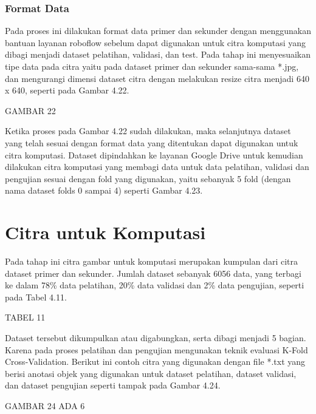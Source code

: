 \subsubsection{Format Data}
\hspace{1,2cm}
Pada proses ini dilakukan format data primer dan sekunder dengan menggunakan bantuan layanan roboflow sebelum dapat digunakan untuk citra komputasi yang dibagi menjadi dataset pelatihan, validasi, dan test.  Pada tahap ini menyesuaikan tipe data pada citra yaitu pada dataset primer dan sekunder sama-sama *.jpg, dan mengurangi dimensi dataset citra dengan melakukan resize citra menjadi 640 x 640, seperti pada Gambar 4.22. 

GAMBAR 22

Ketika proses pada Gambar 4.22 sudah dilakukan, maka selanjutnya dataset yang telah sesuai dengan format data yang ditentukan dapat digunakan untuk citra komputasi. Dataset dipindahkan ke layanan Google Drive untuk kemudian dilakukan citra komputasi yang membagi data untuk data pelatihan, validasi dan pengujian sesuai dengan fold yang digunakan, yaitu sebanyak 5 fold (dengan nama dataset folds 0 sampai 4) seperti Gambar 4.23.

\section{Citra untuk Komputasi}
\hspace{1,2cm}
Pada tahap ini citra gambar untuk komputasi merupakan kumpulan dari citra dataset primer dan sekunder. Jumlah dataset sebanyak 6056 data, yang terbagi ke dalam 78\% data pelatihan, 20\% data validasi dan 2\% data pengujian, seperti pada Tabel 4.11.

TABEL 11

Dataset tersebut dikumpulkan atau digabungkan, serta dibagi menjadi 5 bagian. Karena pada proses pelatihan dan pengujian mengunakan teknik evaluasi K-Fold Cross-Validation. Berikut ini contoh citra yang digunakan dengan file *.txt yang berisi anotasi objek yang digunakan untuk dataset pelatihan, dataset validasi, dan dataset pengujian seperti tampak pada Gambar 4.24.

GAMBAR 24 ADA 6